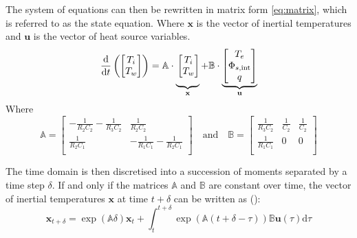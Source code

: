 \documentclass[11pt]{article}
\begin{document}
        The system of equations can then be rewritten in matrix form \eqref{eq:matrix}, which is referred to as the state equation. Where $\mathbf{x}$ is the vector of inertial temperatures and $\mathbf{u}$ is the vector of heat source variables. 
        \begin{equation}\label{eq:matrix}
          \frac{\mathrm{d}}{\mathrm{d}t}\left(\begin{bmatrix}
            T_i\\
            T_w
          \end{bmatrix}\right) = \mathbb{A} \cdot \underbrace{\vphantom{\begin{bmatrix}
            T_e\\
            \Phi_{s,\mathrm{int}}\\
            q
          \end{bmatrix}}\begin{bmatrix}
            T_i\\
            T_w
          \end{bmatrix}}_{\mathbf{x}} + \mathbb{B}\cdot\underbrace{\begin{bmatrix}
            T_e\\
            \Phi_{s,\mathrm{int}}\\
            q
          \end{bmatrix}}_{\mathbf{u}}
        \end{equation}
        \noindent
        Where
        $$
        \mathbb{A}  = \begin{bmatrix}
            -\frac{1}{R_2 C_2} - \frac{1}{R_3 C_2} & \frac{1}{R_2 C_2}\\
            \frac{1}{R_2 C_1} & -\frac{1}{R_1 C_1} - \frac{1}{R_2 C_1}\\
          \end{bmatrix}
        \quad\text{and}\quad
        \mathbb{B}  = \begin{bmatrix}
            \frac{1}{R_3 C_2} & \frac{1}{C_2} & \frac{1}{C_2}\\
            \frac{1}{R_1 C_1}  & 0 & 0\\
          \end{bmatrix}
        $$

        The time domain is then discretised into a succession of moments separated by a time step $\delta$. If and only if the matrices $\mathbb{A}$ and $\mathbb{B}$ are constant over time, the vector of inertial temperatures $\mathbf{x}$ at time $t+\delta$ can be written as (\cite{brogan_modern_1991}):
        \begin{equation}\label{eq:xtdelta}
            \mathbf{x}_{t+\delta} = \exp\left(\mathbb{A}\delta\right)\mathbf{x}_{t} + \int_t^{t+\delta} \exp\left(\mathbb{A}(t+\delta-\tau)\right) \mathbb{B}\mathbf{u}(\tau)\mathrm{d}\tau
        \end{equation}
        
\end{document}
